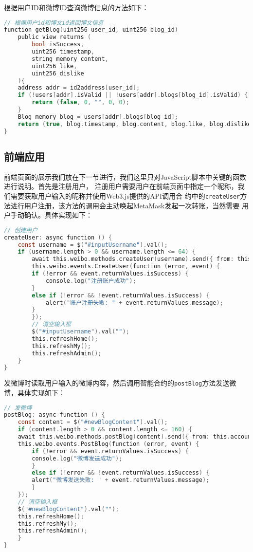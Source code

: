 \documentclass[bwprint]{hfutreport}
\begin{document}
根据用户ID和微博ID查询微博信息的方法如下：
\begin{lstlisting}[language=c]
// 根据用户id和博文id返回博文信息
function getBlog(uint256 user_id, uint256 blog_id)
    public view returns (
        bool isSuccess,
        uint256 timestamp,
        string memory content,
        uint256 like,
        uint256 dislike
    ){
    address addr = id2address[user_id];
    if (!users[addr].isValid || !users[addr].blogs[blog_id].isValid) {
        return (false, 0, "", 0, 0);
    }
    Blog memory blog = users[addr].blogs[blog_id];
    return (true, blog.timestamp, blog.content, blog.like, blog.dislike);
}
\end{lstlisting}

\subsection{前端应用}
前端页面的展示我们放在下一节进行，我们这里只对JavaScript脚本中关键的函数进行说明。首先是注册用户，
注册用户需要用户在前端页面中指定一个昵称，我们需要获取用户输入的昵称并使用Web3.js提供的API调用合
约中的\verb|createUser|方法进行用户注册，该方法的调用会主动唤起MetaMask发起一次转账，当然需要
用户手动确认。具体实现如下：

\begin{lstlisting}[language=c]
// 创建用户
createUser: async function () {
    const username = $("#inputUsername").val();
    if (username.length > 0 && username.length <= 64) {
        await this.weibo.methods.createUser(username).send({ from: this.account });
        this.weibo.events.CreateUser(function (error, event) {
        if (!error && event.returnValues.isSuccess) {
            console.log("注册账户成功");
        }
        else if (!error && !event.returnValues.isSuccess) {
            alert("账户注册失败: " + event.returnValues.message);
        }
        });
        // 清空输入框
        $("#inputUsername").val("");
        this.refreshHome();
        this.refreshMy();
        this.refreshAdmin();
    }
}
\end{lstlisting}

发微博时读取用户输入的微博内容，然后调用智能合约的\verb|postBlog|方法发送微博，具体实现如下：
\begin{lstlisting}[language=c]
// 发微博
postBlog: async function () {
    const content = $("#newBlogContent").val();
    if (content.length > 0 && content.length <= 160) {
    await this.weibo.methods.postBlog(content).send({ from: this.account });
    this.weibo.events.PostBlog(function (error, event) {
        if (!error && event.returnValues.isSuccess) {
        console.log("微博发送成功");
        }
        else if (!error && !event.returnValues.isSuccess) {
        alert("微博发送失败: " + event.returnValues.message);
        }
    });
    // 清空输入框
    $("#newBlogContent").val("");
    this.refreshHome();
    this.refreshMy();
    this.refreshAdmin();
    }
}
\end{lstlisting}
\end{document}
